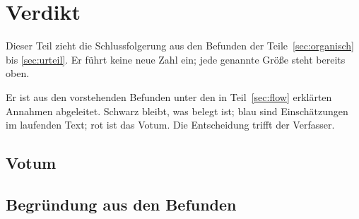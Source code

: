 \section{Verdikt}
\label{sec:verdikt}

Dieser Teil zieht die Schlussfolgerung aus den Befunden der
Teile~\ref{sec:organisch} bis \ref{sec:urteil}. Er f\"uhrt keine neue Zahl
ein; jede genannte Gr\"o{\ss}e steht bereits oben.

 Er ist aus den
vorstehenden Befunden unter den in Teil~\ref{sec:flow} erkl\"arten Annahmen
abgeleitet. Schwarz bleibt, was belegt ist; blau sind Einsch\"atzungen im
laufenden Text; rot ist das Votum. Die Entscheidung trifft der Verfasser.

\subsection{Votum}


\subsection{Begr\"undung aus den Befunden}

